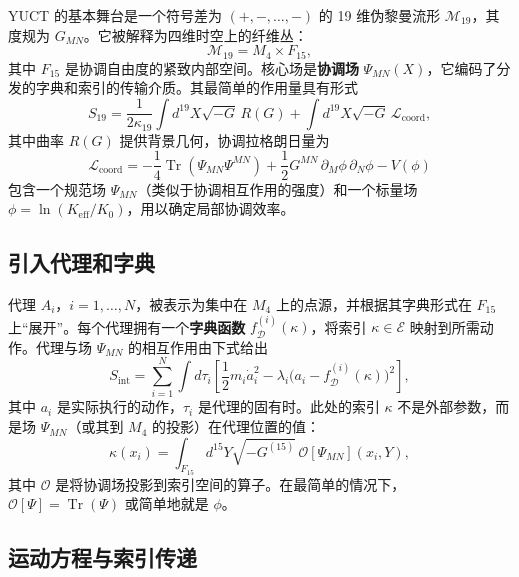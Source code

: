 \documentclass[11pt,a4paper]{article}
\DeclareMathOperator{\Tr}{Tr}
\begin{document}
	YUCT 的基本舞台是一个符号差为 \((+,-,\dots,-)\) 的 19 维伪黎曼流形 \(\mathcal{M}_{19}\)，其度规为 \(G_{MN}\)。它被解释为四维时空上的纤维丛：
	\begin{equation}
		\mathcal{M}_{19} = M_4 \times F_{15},
	\end{equation}
	其中 \(F_{15}\) 是协调自由度的紧致内部空间。核心场是\textbf{协调场} \(\Psi_{MN}(X)\)，它编码了分发的字典和索引的传输介质。其最简单的作用量具有形式
	\begin{equation}
		S_{19} = \frac{1}{2\kappa_{19}} \int d^{19}X \sqrt{-G}\, R(G) + \int d^{19}X \sqrt{-G}\, \mathcal{L}_{\mathrm{coord}},
		\label{eq:S19}
	\end{equation}
	其中曲率 \(R(G)\) 提供背景几何，协调拉格朗日量为
	\begin{equation}
		\mathcal{L}_{\mathrm{coord}} = -\frac{1}{4} \Tr(\Psi_{MN}\Psi^{MN}) + \frac{1}{2} G^{MN}\,\partial_M \phi\,\partial_N \phi - V(\phi)
		\label{eq:Lcoord}
	\end{equation}
	包含一个规范场 \(\Psi_{MN}\)（类似于协调相互作用的强度）和一个标量场 \(\phi = \ln(K_{\mathrm{eff}}/K_0)\)，用以确定局部协调效率。
	
	\subsection{引入代理和字典}
	
	代理 \(A_i\)，\(i=1,\dots,N\)，被表示为集中在 \(M_4\) 上的点源，并根据其字典形式在 \(F_{15}\) 上“展开”。每个代理拥有一个\textbf{字典函数} \(f_{\mathcal{D}}^{(i)}(\kappa)\)，将索引 \(\kappa \in \mathcal{E}\) 映射到所需动作。代理与场 \(\Psi_{MN}\) 的相互作用由下式给出
	\begin{equation}
		S_{\mathrm{int}} = \sum_{i=1}^{N} \int d\tau_i \left[ \frac{1}{2} m_i \dot a_i^2 - \lambda_i \bigl( a_i - f_{\mathcal{D}}^{(i)}(\kappa) \bigr)^2 \right],
		\label{eq:Sint}
	\end{equation}
	其中 \(a_i\) 是实际执行的动作，\(\tau_i\) 是代理的固有时。此处的索引 \(\kappa\) 不是外部参数，而是场 \(\Psi_{MN}\)（或其到 \(M_4\) 的投影）在代理位置的值：
	\begin{equation}
		\kappa(x_i) = \int_{F_{15}} d^{15}Y \sqrt{-G^{(15)}}\, \mathcal{O}[\Psi_{MN}](x_i, Y),
		\label{eq:kappa}
	\end{equation}
	其中 \(\mathcal{O}\) 是将协调场投影到索引空间的算子。在最简单的情况下，\(\mathcal{O}[\Psi] = \Tr(\Psi)\) 或简单地就是 \(\phi\)。
	
	\subsection{运动方程与索引传递}
	
\end{document}
